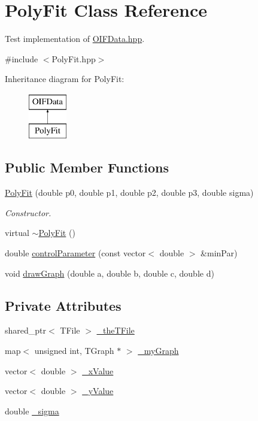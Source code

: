 \hypertarget{classPolyFit}{
\section{PolyFit Class Reference}
\label{de/d89/classPolyFit}
}


Test implementation of \hyperlink{OIFData_8hpp}{OIFData.hpp}.  




{\ttfamily \#include $<$PolyFit.hpp$>$}

Inheritance diagram for PolyFit:\begin{figure}[H]
\begin{center}
\leavevmode
\includegraphics[height=2.000000cm]{de/d89/classPolyFit}
\end{center}
\end{figure}
\subsection*{Public Member Functions}
\begin{DoxyCompactItemize}
\item 
\hyperlink{classPolyFit_abfc9528462669ea53ce08e4945c4ce99}{PolyFit} (double p0, double p1, double p2, double p3, double sigma)
\begin{DoxyCompactList}\small\item\em Constructor. \end{DoxyCompactList}\item 
virtual \hyperlink{classPolyFit_a3462736e02f02d3ab46ccd64aaf235d3}{$\sim$PolyFit} ()
\item 
double \hyperlink{classPolyFit_a5e7833b86023f7497b548711777bc273}{controlParameter} (const vector$<$ double $>$ \&minPar)
\item 
void \hyperlink{classPolyFit_ad90dd471fea18051d5c0c2e5b483f0a5}{drawGraph} (double a, double b, double c, double d)
\end{DoxyCompactItemize}
\subsection*{Private Attributes}
\begin{DoxyCompactItemize}
\item 
shared\_\-ptr$<$ TFile $>$ \hyperlink{classPolyFit_a9905a65c08ba059c98a0e4cf14dc1752}{\_\-theTFile}
\item 
map$<$ unsigned int, TGraph $\ast$ $>$ \hyperlink{classPolyFit_ae3de4c7d4cda8ce2cf162d9d70631cba}{\_\-myGraph}
\item 
vector$<$ double $>$ \hyperlink{classPolyFit_a0092a72e38616b0541f5ca2d3e109397}{\_\-xValue}
\item 
vector$<$ double $>$ \hyperlink{classPolyFit_a29d10890ebfda2ec6f0e7697dca5258f}{\_\-yValue}
\item 
double \hyperlink{classPolyFit_a0a19ea869319d65f97de4d0bc95e8061}{\_\-sigma}
\end{DoxyCompactItemize}


